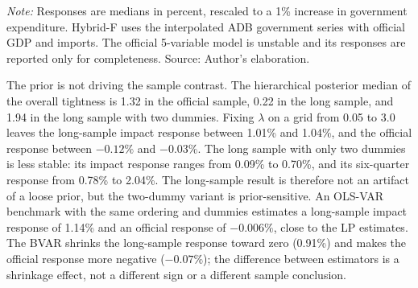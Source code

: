 \documentclass[11pt,a4paper]{article}
\begin{document}
\begin{table}[htbp]
\centering
\small
\caption{Robustness: stability and selected responses}
\label{tab:robustness}
\par\vspace{0.3em}
\begin{minipage}{0.95\textwidth}
\footnotesize\textit{Note:} Responses are medians in percent, rescaled to a 1\% increase in government expenditure. Hybrid-F uses the interpolated ADB government series with official GDP and imports. The official 5-variable model is unstable and its responses are reported only for completeness. Source: Author's elaboration.
\end{minipage}
\end{table}

The prior is not driving the sample contrast. The hierarchical posterior median of the overall tightness is 1.32 in the official sample, 0.22 in the long sample, and 1.94 in the long sample with two dummies. Fixing $\lambda$ on a grid from 0.05 to 3.0 leaves the long-sample impact response between 1.01\% and 1.04\%, and the official response between $-0.12\%$ and $-0.03\%$. The long sample with only two dummies is less stable: its impact response ranges from 0.09\% to 0.70\%, and its six-quarter response from 0.78\% to 2.04\%. The long-sample result is therefore not an artifact of a loose prior, but the two-dummy variant is prior-sensitive. An OLS-VAR benchmark with the same ordering and dummies estimates a long-sample impact response of 1.14\% and an official response of $-0.006\%$, close to the LP estimates. The BVAR shrinks the long-sample response toward zero (0.91\%) and makes the official response more negative ($-0.07\%$); the difference between estimators is a shrinkage effect, not a different sign or a different sample conclusion.
\end{document}
